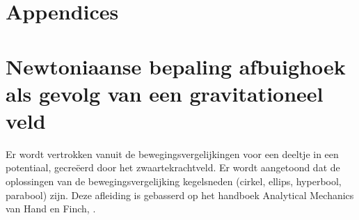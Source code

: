 \clearpage
\appendix
{}
\section*{Appendices}
\section{Newtoniaanse bepaling afbuighoek als gevolg van een gravitationeel veld}
\label{appendix: newton}
Er wordt vertrokken vanuit de bewegingsvergelijkingen voor een deeltje in een potentiaal, gecreëerd door het zwaartekrachtveld. Er wordt aangetoond dat de oplossingen van de bewegingsvergelijking kegelsneden (cirkel, ellips, hyperbool, parabool) zijn. Deze afleiding is gebasserd op het handboek Analytical Mechanics van Hand en Finch, \cite{hand-1998}.
